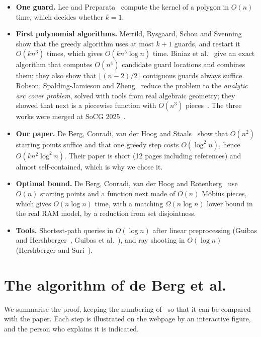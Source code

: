 \documentclass[11pt,a4paper]{article}
\theoremstyle{definition}
\theoremstyle{remark}
\newcommand{\nextop}{\mathrm{next}}
\begin{document}
\begin{itemize}
\item \textbf{One guard.} Lee and Preparata~\cite{LeePreparata1979} compute the kernel of a polygon in $O(n)$ time, which decides whether $k=1$.
\item \textbf{First polynomial algorithms.} Merrild, Rysgaard, Schou and Svenning~\cite{Merrild2024} show that the greedy algorithm uses at most $k+1$ guards,
and restart it $O(kn^3)$ times, which gives $O(kn^5\log n)$ time. Biniaz et al.~\cite{Biniaz2024} give an exact algorithm that computes $O(n^4)$ candidate guard locations and combines them;
they also show that $\lfloor (n-2)/2\rfloor$ contiguous guards always suffice. Robson, Spalding-Jamieson and Zheng~\cite{Robson2024} reduce the problem to the \emph{analytic arc cover problem}, solved with tools
from real algebraic geometry; they showed that $\nextop$ is a piecewise function with $O(n^3)$ pieces~\cite{deBerg2026}. The three works were merged at SoCG 2025~\cite{Biniaz2025}.
\item \textbf{Our paper.} De Berg, Conradi, van der Hoog and Staals~\cite{deBerg2025} show that $O(n^2)$ starting points suffice and that one greedy step
costs $O(\log^2 n)$, hence $O(kn^2\log^2 n)$. Their paper is short (12 pages including references) and almost self-contained, which is why we chose it.
\item \textbf{Optimal bound.} De Berg, Conradi, van der Hoog and Rotenberg~\cite{deBerg2026} use $O(n)$ starting points and a function $\nextop$ made of $O(n)$
M\"obius pieces, which gives $O(n\log n)$ time, with a matching $\Omega(n\log n)$ lower bound in the real RAM model, by a reduction from set disjointness.
\item \textbf{Tools.} Shortest-path queries in $O(\log n)$ after linear preprocessing (Guibas and Hershberger~\cite{GuibasHershberger1989},
Guibas et al.~\cite{Guibas1987}), and ray shooting in $O(\log n)$ (Hershberger and Suri~\cite{HershbergerSuri1995}).
\end{itemize}

\section{The algorithm of de Berg et al.}
\label{sec:algo}

We summarise the proof, keeping the numbering of~\cite{deBerg2025} so that it can be compared with the paper. Each step is illustrated on the webpage by
an interactive figure, and the person who explains it is indicated.
\end{document}
